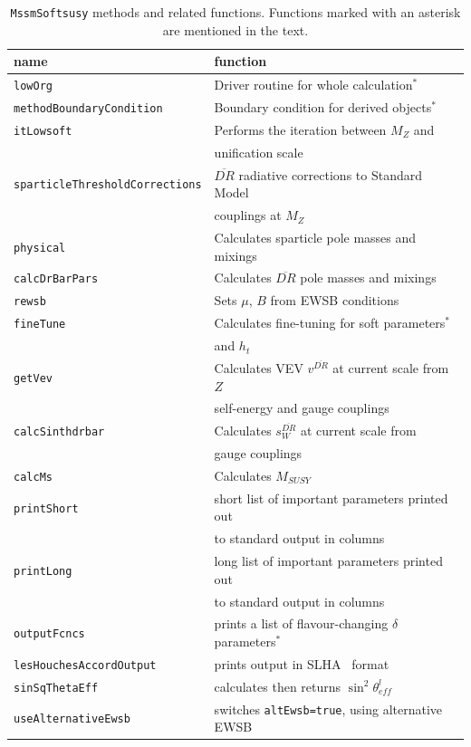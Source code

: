 \documentclass{article}
\def\code#1{\small{\tt #1}\normalsize}
\begin{document}
\begin{table}\begin{center}\begin{tabular}{ll} 
name & function \\ \hline
\code{lowOrg} & Driver routine for whole calculation$^*$\\ 
\code{methodBoundaryCondition} & Boundary condition for derived objects$^*$\\
\code{itLowsoft} & Performs the iteration between $M_Z$ and \\
 &unification scale\\  
\code{sparticleThresholdCorrections} & $\overline{DR}$ radiative corrections
to Standard Model \\
 & couplings at $M_Z$\\ 
\code{physical} & Calculates sparticle pole masses and mixings\\ 
\code{calcDrBarPars} & Calculates $\overline{DR}$ pole masses and mixings\\ 
\code{rewsb} & Sets $\mu$, $B$ from EWSB conditions\\ 
\code{fineTune} & Calculates fine-tuning for soft parameters$^*$ \\ & and
$h_t$\\ 
\code{getVev} & Calculates VEV $v^{\overline{DR}}$ at current scale from $Z$\\
 & self-energy and gauge couplings\\ 
\code{calcSinthdrbar} & Calculates $s_W^{\overline{DR}}$ at current scale
from\\  & gauge couplings \\
\code{calcMs} & Calculates $M_{SUSY}$\\ 
\code{printShort} & short list of important parameters printed out \\ &to standard
output in columns\\ 
\code{printLong} & long list of important parameters printed out \\ &to standard
output in columns\\ 
\code{outputFcncs} & prints a list of flavour-changing $\delta$
parameters$^*$\\
\code{lesHouchesAccordOutput} & prints output in SLHA~\cite{lhacc} format\\
\code{sinSqThetaEff} & calculates then returns $\sin^2\theta_{eff}^l$\\
\code{useAlternativeEwsb} & switches \code{altEwsb=true}, using alternative
EWSB \\ 
\end{tabular}
\caption{\label{tab:softmeth}\code{MssmSoftsusy} methods and related functions. Functions marked with an
asterisk are mentioned in the text.}\end{center}\end{table}
\end{document}

